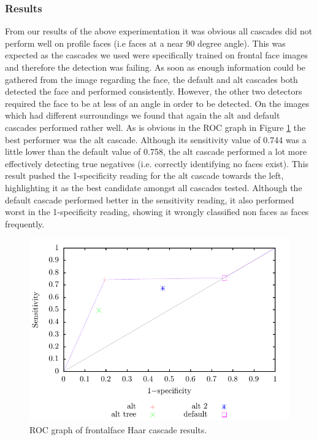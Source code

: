 \documentclass[conference]{IEEEtran}
\begin{document}
\subsubsection{Results}
From our results of the above experimentation it was obvious all cascades did not perform well on profile faces (i.e faces at a near 90 degree angle). This was expected as the cascades we used were specifically trained on frontal face images and therefore the detection was failing. As soon as enough information could be gathered from the image regarding the face, the default and alt cascades both detected the face and performed consistently. However, the other two detectors required the face to be at less of an angle in order to be detected. On the images which had different surroundings we found that again the alt and default cascades performed rather well. As is obvious in the ROC graph in Figure \ref{fig:haar} the best performer was the alt cascade. Although its sensitivity value of 0.744 was a little lower than the default value of 0.758, the alt cascade performed a lot more effectively detecting true negatives (i.e. correctly identifying no faces exist). This result pushed the 1-specificity reading for the alt cascade towards the left, highlighting it as the best candidate amongst all cascades tested. Although the default cascade performed better in the sensitivity reading, it also performed worst in the 1-specificity reading, showing it wrongly classified non faces as faces frequently.
\begin{figure}
  \includegraphics[width=\columnwidth]{haar_ROC}
  \caption{ROC graph of frontalface Haar cascade results.}
  \label{fig:haar}
\end{figure}
\end{document}
